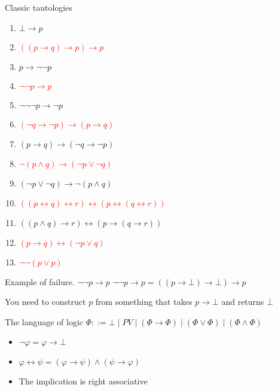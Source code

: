 \documentclass[sans]{beamer}
\begin{document}
\begin{frame}{Classic tautologies}
   \begin{enumerate}
     \item $\bot \to p$
     \item \textcolor{red}{$((p \to q) \to p) \to p$}
     \item $p \to \lnot \lnot p$
     \item \textcolor{red}{$\lnot \lnot p \to p$}
     \item $\lnot \lnot \lnot p \to \lnot p$
     \item \textcolor{red}{$(\lnot q \to \lnot p) \to (p \to q)$}
     \item $(p \to q) \to (\lnot q \to \lnot p)$
     \item \textcolor{red}{$\lnot (p \wedge q) \to (\lnot p \vee \lnot q)$}
     \item $(\lnot p \vee \lnot q) \to \lnot (p \wedge q)$
     \item \textcolor{red}{$((p \leftrightarrow q) \leftrightarrow r) \leftrightarrow (p \leftrightarrow (q \leftrightarrow r))$}
     \item $((p \wedge q) \to r) \leftrightarrow (p \to (q \to r))$
     \item \textcolor{red}{$(p \to q) \leftrightarrow (\lnot p \vee q)$}
     \item \textcolor{red}{$\lnot\lnot (p \vee p)$}
   \end{enumerate}
\end{frame}

\begin{frame}{Example of failure. $\lnot \lnot p \to p$}
  $\lnot \lnot p \to p = ((p \to \bot) \to \bot) \to p$

  \vspace{1cm}

  You need to construct $p$ from something that takes $p \to \bot$
  and returns $\bot$
\end{frame}

\begin{frame}{The language of logic}
  $\Phi ::= \bot \; | \; PV \; | \; (\Phi \to \Phi) \; |
   \; (\Phi \vee \Phi) \; | \; (\Phi \wedge \Phi) $

  \begin{itemize}
    \item $\lnot \varphi = \varphi \to \bot$
    \item $\varphi \leftrightarrow \psi = (\varphi \to \psi) \wedge (\psi \to \varphi)$
    \item The implication is right associative
  \end{itemize}
\end{frame}
\end{document}

